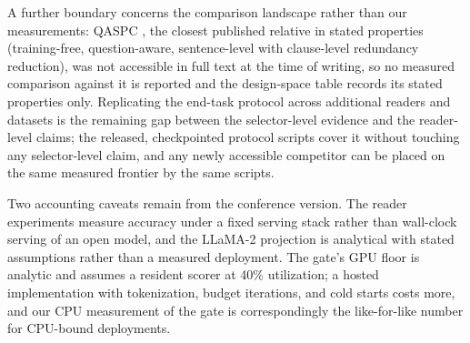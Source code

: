 \documentclass[pdflatex,sn-basic]{sn-jnl}
\theoremstyle{remark}
\begin{document}
A further boundary concerns the comparison landscape rather than our
measurements: QASPC \citep{chen2025qaspc}, the closest published
relative in stated properties (training-free, question-aware,
sentence-level with clause-level redundancy reduction), was not
accessible in full text at the time of writing, so no measured
comparison against it is reported and the design-space table records
its stated properties only. Replicating the end-task protocol across
additional readers and datasets is the remaining gap between the
selector-level evidence and the reader-level claims; the released,
checkpointed protocol scripts cover it without touching any
selector-level claim, and any newly accessible competitor can be
placed on the same measured frontier by the same scripts.

Two accounting caveats remain from the conference version. The reader
experiments measure accuracy under a fixed serving stack rather than
wall-clock serving of an open model, and the LLaMA-2 projection is
analytical with stated assumptions rather than a measured deployment.
The gate's GPU floor is analytic and assumes a resident scorer at 40\%
utilization; a hosted implementation with tokenization, budget
iterations, and cold starts costs more, and our CPU measurement of
the gate is correspondingly the like-for-like number for CPU-bound
deployments.
\end{document}
